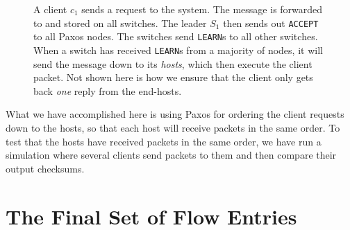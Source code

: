 \begin{figure}
  \centering
  \scriptsize
  \caption{A client $c_1$ sends a request to the system. The message is
    forwarded to and stored on all switches.  The leader $S_1$ then sends out
      \texttt{ACCEPT} to all Paxos nodes.  The switches send \texttt{LEARN}s to
      all other switches.  When a switch has received \texttt{LEARN}s from a
      majority of nodes, it will send the message down to its
      \textit{hosts}, which then execute the client packet.  Not shown here
      is how we ensure that the client only gets back \textit{one} reply
      from the end-hosts.}
  \label{flow:simple}
\end{figure}

What we have accomplished here is using Paxos for
ordering the client
requests down to the hosts, so that each host will receive packets in the
same order.  To test that the hosts have received packets in the same order,
we have run a simulation where several clients send packets to them and then
compare their output checksums.

\section{The Final Set of Flow Entries}
\label{chapter:final.flowtable}

